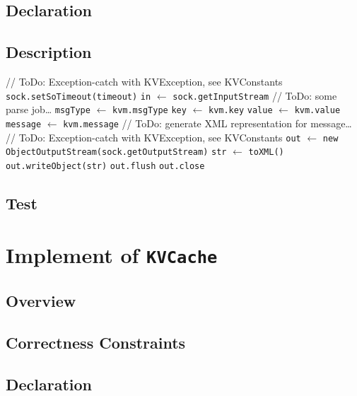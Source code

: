 \documentclass{article}
\begin{document}
\subsection{Declaration}
\subsection{Description}
\begin{algorithm}
	\begin{algorithmic}
			\State // ToDo: Exception-catch with KVException, see KVConstants
			\State \texttt{sock.setSoTimeout(timeout)}
			\State \texttt{in} $\leftarrow$ \texttt{sock.getInputStream}
			\State // ToDo: some parse job\dots
		\EndProcedure
			\State \texttt{msgType} $\leftarrow$ \texttt{kvm.msgType}
			\State \texttt{key} $\leftarrow$ \texttt{kvm.key}
			\State \texttt{value} $\leftarrow$ \texttt{kvm.value}
			\State \texttt{message} $\leftarrow$ \texttt{kvm.message}
		\EndProcedure
			\State // ToDo: generate XML representation for message\dots
		\EndProcedure
			\State // ToDo: Exception-catch with KVException, see KVConstants
			\State \texttt{out} $\leftarrow$ \texttt{new ObjectOutputStream(sock.getOutputStream)}
			\State \texttt{str} $\leftarrow$ \texttt{toXML()}
			\State \texttt{out.writeObject(str)}
			\State \texttt{out.flush}
			\State \texttt{out.close}
		\EndProcedure
	\end{algorithmic}
\end{algorithm}
\subsection{Test}

\section{Implement of \texttt{KVCache}}
\subsection{Overview}
\subsection{Correctness Constraints}
\subsection{Declaration}
\end{document}
